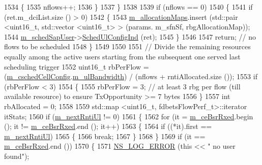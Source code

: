 \begin{DoxyCode}
1534         \{
1535           nflows++;
1536         \}
1537     \}
1538 
1539   \textcolor{keywordflow}{if} (nflows == 0)
1540     \{
1541       \textcolor{keywordflow}{if} (ret.m\_dciList.size () > 0)
1542         \{
1543           \hyperlink{classns3_1_1FdBetFfMacScheduler_a4263d235edb72f1e37dc659586eb0253}{m\_allocationMaps}.insert (std::pair <uint16\_t, std::vector <uint16\_t> > (params.
      m\_sfnSf, rbgAllocationMap));
1544           \hyperlink{classns3_1_1FdBetFfMacScheduler_af2eac2234cc5c2b3d9999f9ec66911d3}{m\_schedSapUser}->\hyperlink{classns3_1_1FfMacSchedSapUser_a1b89636256701a84d990db7db8aea874}{SchedUlConfigInd} (ret);
1545         \}
1546 
1547       \textcolor{keywordflow}{return};  \textcolor{comment}{// no flows to be scheduled}
1548     \}
1549 
1550 
1551   \textcolor{comment}{// Divide the remaining resources equally among the active users starting from the subsequent one served
       last scheduling trigger}
1552   uint16\_t rbPerFlow = (\hyperlink{classns3_1_1FdBetFfMacScheduler_a52a10018d36c6a2e69820346a327dfc9}{m\_cschedCellConfig}.\hyperlink{structns3_1_1FfMacCschedSapProvider_1_1CschedCellConfigReqParameters_a5ab5b102878e6e7e7727a14af4a64d2f}{m\_ulBandwidth}) / (nflows + 
      rntiAllocated.size ());
1553   \textcolor{keywordflow}{if} (rbPerFlow < 3)
1554     \{
1555       rbPerFlow = 3;  \textcolor{comment}{// at least 3 rbg per flow (till available resource) to ensure TxOpportunity >= 7
       bytes}
1556     \}
1557   \textcolor{keywordtype}{int} rbAllocated = 0;
1558 
1559   std::map <uint16\_t, fdbetsFlowPerf\_t>::iterator itStats;
1560   \textcolor{keywordflow}{if} (\hyperlink{classns3_1_1FdBetFfMacScheduler_ade4e2b997a835d6205e7275d58884c41}{m\_nextRntiUl} != 0)
1561     \{
1562       \textcolor{keywordflow}{for} (it = \hyperlink{classns3_1_1FdBetFfMacScheduler_a86411f2dd593676d88de396ef4d0b6e5}{m\_ceBsrRxed}.begin (); it != \hyperlink{classns3_1_1FdBetFfMacScheduler_a86411f2dd593676d88de396ef4d0b6e5}{m\_ceBsrRxed}.end (); it++)
1563         \{
1564           \textcolor{keywordflow}{if} ((*it).first == \hyperlink{classns3_1_1FdBetFfMacScheduler_ade4e2b997a835d6205e7275d58884c41}{m\_nextRntiUl})
1565             \{
1566               \textcolor{keywordflow}{break};
1567             \}
1568         \}
1569       \textcolor{keywordflow}{if} (it == \hyperlink{classns3_1_1FdBetFfMacScheduler_a86411f2dd593676d88de396ef4d0b6e5}{m\_ceBsrRxed}.end ())
1570         \{
1571           \hyperlink{group__logging_ga0261a8db1d4ac5f79417d117634fd455}{NS\_LOG\_ERROR} (\textcolor{keyword}{this} << \textcolor{stringliteral}{" no user found"});

\end{DoxyCode}
